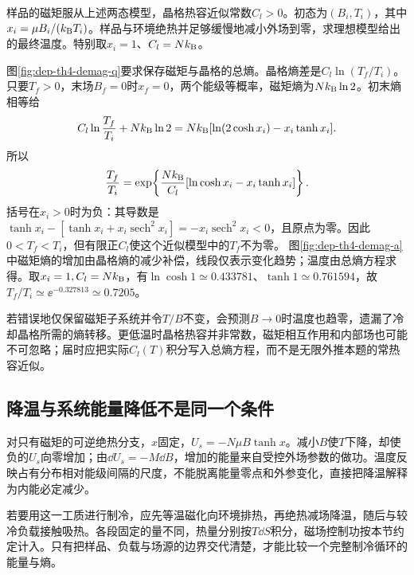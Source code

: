\begin{example}[有限晶格热容的绝热去磁]
样品的磁矩服从上述两态模型，晶格热容近似常数$C_l>0$。初态为$(B_i,T_i)$，其中$x_i=\mu B_i/(k_{\mathrm B} T_i)$。样品与环境绝热并足够缓慢地减小外场到零，求理想模型给出的最终温度。特别取$x_i=1$、$C_l=Nk_{\mathrm B}$。
\end{example}
\begin{solution}
图\ref{fig:dep-th4-demag-q}要求保存磁矩与晶格的总熵。晶格熵差是$C_l\ln(T_f/T_i)$。只要$T_f>0$，末场$B_f=0$时$x_f=0$，两个能级等概率，磁矩熵为$Nk_{\mathrm B}\ln2$。初末熵相等给
\[
 C_l\ln\frac{T_f}{T_i}+Nk_{\mathrm B}\ln2
 =Nk_{\mathrm B}[\ln(2\cosh x_i)-x_i\tanh x_i].
\]
所以
\[
 \frac{T_f}{T_i}=
 \exp\!\left\{\frac{Nk_{\mathrm B}}{C_l}
 [\ln\cosh x_i-x_i\tanh x_i]\right\}.
\]
括号在$x_i>0$时为负：其导数是$\tanh x_i-[\tanh x_i+x_i\operatorname{sech}^2x_i]=-x_i\operatorname{sech}^2x_i<0$，且原点为零。因此$0<T_f<T_i$，但有限正$C_l$使这个近似模型中的$T_f$不为零。
图\ref{fig:dep-th4-demag-a}中磁矩熵的增加由晶格熵的减少补偿，线段仅表示变化趋势；温度由总熵方程求得。取$x_i=1,C_l=Nk_{\mathrm B}$，有$\ln\cosh1\simeq0.433781$、$\tanh1\simeq0.761594$，故$T_f/T_i\simeq\ee^{-0.327813}\simeq0.7205$。

若错误地仅保留磁矩子系统并令$T/B$不变，会预测$B\to0$时温度也趋零，遗漏了冷却晶格所需的熵转移。更低温时晶格热容并非常数，磁矩相互作用和内部场也可能不可忽略；届时应把实际$C_l(T)$积分写入总熵方程，而不是无限外推本题的常热容近似。
\end{solution}

\subsection{降温与系统能量降低不是同一个条件}
对只有磁矩的可逆绝热分支，$x$固定，$U_s=-N\mu B\tanh x$。减小$B$使$T$下降，却使负的$U_s$向零增加；由$\dd U_s=-M\dd B$，增加的能量来自受控外场参数的做功。温度反映占有分布相对能级间隔的尺度，不能脱离能量零点和外参变化，直接把降温解释为内能必定减少。

若要用这一工质进行制冷，应先等温磁化向环境排热，再绝热减场降温，随后与较冷负载接触吸热。各段固定的量不同，热量分别按$T\dd S$积分，磁场控制功按本节约定计入。只有把样品、负载与场源的边界交代清楚，才能比较一个完整制冷循环的能量与熵。
